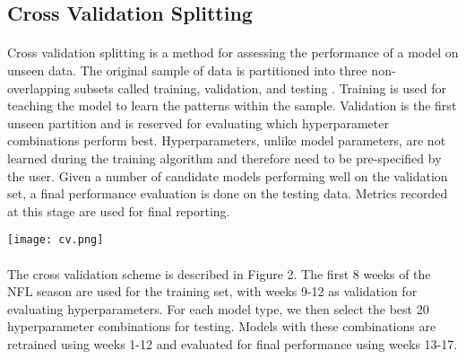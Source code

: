 \documentclass[11pt]{article}
\newenvironment{Figure}
  {\par\medskip\noindent\minipage{\linewidth}}
  {\endminipage\par\medskip}
\begin{document}
\begin{multicols*}{2}
        \subsection{Cross Validation Splitting}
            \paragraph{}
                Cross validation splitting is a method for assessing the performance of a model on unseen data. 
                The original sample of data is partitioned into three non-overlapping subsets called training, validation, and testing \cite{Haykin08}.
                Training is used for teaching the model to learn the patterns within the sample. 
                Validation is the first unseen partition and is reserved for evaluating which hyperparameter combinations perform best. 
                Hyperparameters, unlike model parameters, are not learned during the training algorithm and therefore need to be pre-specified by the user.
                Given a number of candidate models performing well on the validation set, a final performance evaluation is done on the testing data. 
                Metrics recorded at this stage are used for final reporting.

            \vspace{10pt}
                
            \begin{Figure}  
                \centering
                \texttt{[image: cv.png]}
                \label{fig:Cross Validation Splitting}
            \end{Figure}

            \vspace{-10pt}

            \paragraph{}
                The cross validation scheme is described in Figure 2.
                The first 8 weeks of the NFL season are used for the training set, with weeks 9-12 as validation for evaluating hyperparameters.
                For each model type, we then select the best 20 hyperparameter combinations for testing. 
                Models with these combinations are retrained using weeks 1-12 and evaluated for final performance using weeks 13-17. 


\end{multicols*}
\end{document}
